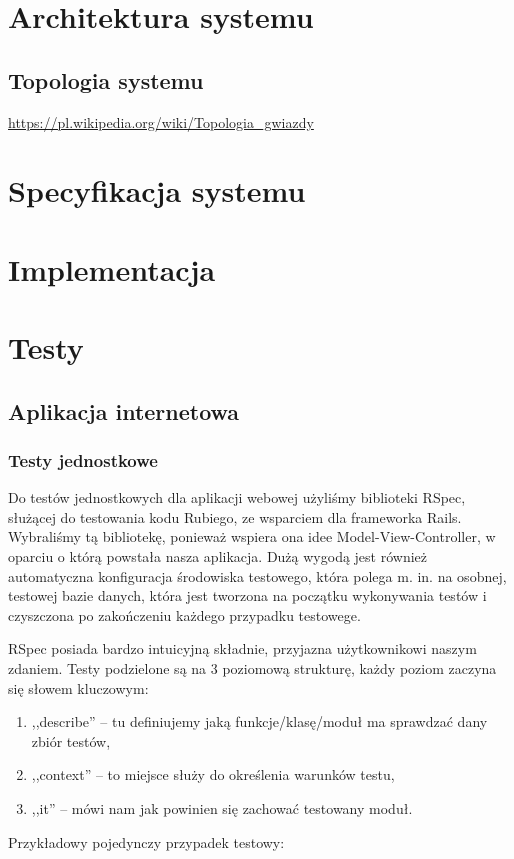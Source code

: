 \documentclass[eng,oneside]{mgr}
\begin{document}
\chapter{Architektura systemu}
\section{Topologia systemu}
\url{https://pl.wikipedia.org/wiki/Topologia_gwiazdy}
\chapter{Specyfikacja systemu}
\chapter{Implementacja}
\chapter{Testy}
\section{Aplikacja internetowa}
\subsection{Testy jednostkowe}
Do testów jednostkowych dla aplikacji webowej użyliśmy biblioteki RSpec, służącej do testowania kodu Rubiego, ze wsparciem dla frameworka Rails. Wybraliśmy tą bibliotekę, ponieważ wspiera ona idee Model-View-Controller, w oparciu o którą powstała nasza aplikacja. Dużą wygodą jest również automatyczna konfiguracja środowiska testowego, która polega m. in.  na osobnej, testowej bazie danych, która jest tworzona na początku wykonywania testów i czyszczona po zakończeniu każdego przypadku testowege.

RSpec posiada bardzo intuicyjną składnie, przyjazna użytkownikowi naszym zdaniem. Testy podzielone są na 3 poziomową strukturę, każdy poziom zaczyna się słowem kluczowym:
\begin{enumerate}
	\item ,,describe'' – tu definiujemy jaką funkcje/klasę/moduł ma sprawdzać dany zbiór testów,
	\item ,,context'' – to miejsce służy do określenia warunków testu,
	\item ,,it'' – mówi nam jak powinien się zachować testowany moduł.
\end{enumerate}

Przykładowy pojedynczy przypadek testowy:
\end{document}
